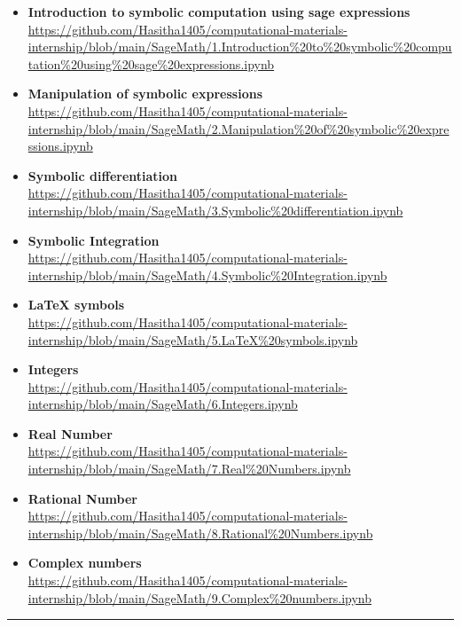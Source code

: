 \documentclass[a4paper,12pt=]{article}
\begin{document}
\begin{itemize}
    \item \textbf{Introduction to symbolic computation using sage expressions}
    \\ \url{https://github.com/Hasitha1405/computational-materials-internship/blob/main/SageMath/1.Introduction%20to%20symbolic%20computation%20using%20sage%20expressions.ipynb}

    \item \textbf{Manipulation of symbolic expressions}
    \\ \url{https://github.com/Hasitha1405/computational-materials-internship/blob/main/SageMath/2.Manipulation%20of%20symbolic%20expressions.ipynb}

    \item \textbf{Symbolic differentiation}
    \\ \url{https://github.com/Hasitha1405/computational-materials-internship/blob/main/SageMath/3.Symbolic%20differentiation.ipynb}

    \item \textbf{Symbolic Integration}
    \\ \url{https://github.com/Hasitha1405/computational-materials-internship/blob/main/SageMath/4.Symbolic%20Integration.ipynb}

    \item \textbf{LaTeX symbols}
    \\ \url{https://github.com/Hasitha1405/computational-materials-internship/blob/main/SageMath/5.LaTeX%20symbols.ipynb}
    
    \item \textbf{Integers}
    \\ \url{https://github.com/Hasitha1405/computational-materials-internship/blob/main/SageMath/6.Integers.ipynb}
    
    \item \textbf{Real Number}
    \\ \url{https://github.com/Hasitha1405/computational-materials-internship/blob/main/SageMath/7.Real%20Numbers.ipynb}
    
    \item \textbf{Rational Number}
    \\ \url{https://github.com/Hasitha1405/computational-materials-internship/blob/main/SageMath/8.Rational%20Numbers.ipynb}
    
    \item \textbf{Complex numbers}
    \\ \url{https://github.com/Hasitha1405/computational-materials-internship/blob/main/SageMath/9.Complex%20numbers.ipynb}
    
    
\end{itemize}
\rule{\linewidth}{0.1pt}
\end{document}
